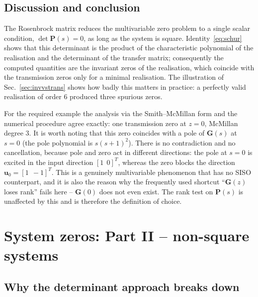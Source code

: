 \subsection{Discussion and conclusion}

The Rosenbrock matrix reduces the multivariable zero problem to a single scalar condition,
$\det\mathbf{P}(s)=0$, as long as the system is square. Identity~\eqref{eq:schur} shows that this
determinant is the product of the characteristic polynomial of the realisation and the
determinant of the transfer matrix; consequently the computed quantities are the invariant zeros
of the realisation, which coincide with the transmission zeros only for a minimal realisation.
The illustration of Sec.~\ref{sec:invvstrans} shows how badly this matters in practice: a
perfectly valid realisation of order $6$ produced three spurious zeros.

For the required example the analysis via the Smith--McMillan form and the numerical procedure
agree exactly: one transmission zero at $z=0$, McMillan degree $3$. It is worth noting that this
zero coincides with a pole of $\mathbf{G}(s)$ at $s=0$ (the pole polynomial is $s(s+1)^2$).
There is no contradiction and no cancellation, because pole and zero act in different
directions: the pole at $s=0$ is excited in the input direction $[1\ \ 0]^T$, whereas the
zero blocks the direction $\mathbf{u}_0=[1\ \ -1]^T$. This is a genuinely multivariable
phenomenon that has no SISO counterpart, and it is also the reason why the frequently used
shortcut ``$\mathbf{G}(z)$ loses rank'' fails here -- $\mathbf{G}(0)$ does not even exist. The
rank test on $\mathbf{P}(s)$ is unaffected by this and is therefore the definition of choice.

\section{System zeros: Part II -- non-square systems}
\label{sec:zeros2}

\subsection{Why the determinant approach breaks down}

